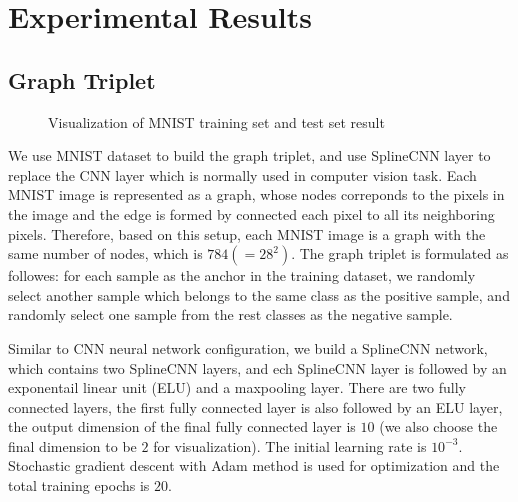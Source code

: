 \section{Experimental Results}
\label{sec:experiment}




\subsection{Graph Triplet}

\begin{figure}[htb]
    \begin{minipage}[b]{0.48\linewidth}
        \centering
        \centerline{}
    \end{minipage}
    \hfill
    \begin{minipage}[b]{0.48\linewidth}
        \centering
        \centerline{}
    \end{minipage}
    \caption{Visualization of MNIST training set and test set result}
    \label{fig:mnist_plot}
\end{figure}

We use MNIST dataset \cite{LecunIEEE1998} to build the graph triplet, and use SplineCNN layer \cite{FeyCVPR2018splinecnn} \cite{FeyICLR2020DGMC} to replace the CNN layer which is normally used in computer vision task. Each MNIST image is represented as a graph, whose nodes correponds to the pixels in the image and the edge is formed by connected each pixel to all its neighboring pixels. Therefore, based on this setup, each MNIST image is a graph with the same number of nodes, which is $784(=28^2)$. The graph triplet is formulated as followes: for each sample as the anchor in the training dataset, we randomly select another sample which belongs to the same class as the positive sample, and randomly select one sample from the rest classes as the negative sample. 

Similar to CNN neural network configuration, we build a SplineCNN network, which contains two SplineCNN layers, and ech SplineCNN layer is followed by an exponentail linear unit (ELU) and a maxpooling layer. There are two fully connected layers, the first fully connected layer is also followed by an ELU layer, the output dimension of the final fully connected layer is $10$ (we also choose the final dimension to be $2$ for visualization). The initial learning rate is $10^{-3}$. Stochastic gradient descent with Adam method is used for optimization and the total training epochs is $20$.

